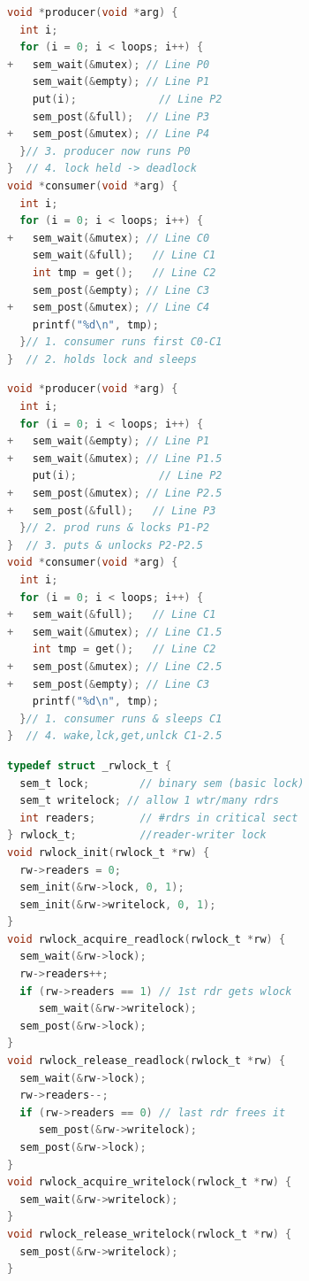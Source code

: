 \begin{minipage}{.5\linewidth}
\begin{lstlisting}[language=c,xleftmargin=2pt,xrightmargin=2pt,framexbottommargin=2pt]
void *producer(void *arg) {
  int i;
  for (i = 0; i < loops; i++) {
+   sem_wait(&mutex); // Line P0
    sem_wait(&empty); // Line P1
    put(i);             // Line P2
    sem_post(&full);  // Line P3
+   sem_post(&mutex); // Line P4
  }// 3. producer now runs P0
}  // 4. lock held -> deadlock
void *consumer(void *arg) {
  int i;
  for (i = 0; i < loops; i++) {
+   sem_wait(&mutex); // Line C0
    sem_wait(&full);   // Line C1
    int tmp = get();   // Line C2
    sem_post(&empty); // Line C3
+   sem_post(&mutex); // Line C4
    printf("%d\n", tmp);
  }// 1. consumer runs first C0-C1
}  // 2. holds lock and sleeps
\end{lstlisting}
\end{minipage}
\begin{minipage}{.5\linewidth}
\begin{lstlisting}[language=c,xleftmargin=4pt,xrightmargin=0pt,framexbottommargin=2pt]
void *producer(void *arg) {
  int i;
  for (i = 0; i < loops; i++) {
+   sem_wait(&empty); // Line P1
+   sem_wait(&mutex); // Line P1.5
    put(i);             // Line P2
+   sem_post(&mutex); // Line P2.5
+   sem_post(&full);   // Line P3
  }// 2. prod runs & locks P1-P2
}  // 3. puts & unlocks P2-P2.5
void *consumer(void *arg) {
  int i;
  for (i = 0; i < loops; i++) {
+   sem_wait(&full);   // Line C1
+   sem_wait(&mutex); // Line C1.5
    int tmp = get();   // Line C2
+   sem_post(&mutex); // Line C2.5
+   sem_post(&empty); // Line C3
    printf("%d\n", tmp);
  }// 1. consumer runs & sleeps C1
}  // 4. wake,lck,get,unlck C1-2.5
\end{lstlisting}
\end{minipage}
\begin{minipage}{.64\linewidth}
\begin{lstlisting}[language=c,framexbottommargin=1pt]
typedef struct _rwlock_t {
  sem_t lock;        // binary sem (basic lock)
  sem_t writelock; // allow 1 wtr/many rdrs
  int readers;       // #rdrs in critical sect
} rwlock_t;          //reader-writer lock
void rwlock_init(rwlock_t *rw) {
  rw->readers = 0;
  sem_init(&rw->lock, 0, 1);
  sem_init(&rw->writelock, 0, 1);
}
void rwlock_acquire_readlock(rwlock_t *rw) {
  sem_wait(&rw->lock);
  rw->readers++;
  if (rw->readers == 1) // 1st rdr gets wlock
     sem_wait(&rw->writelock);
  sem_post(&rw->lock);
}
void rwlock_release_readlock(rwlock_t *rw) {
  sem_wait(&rw->lock);
  rw->readers--;
  if (rw->readers == 0) // last rdr frees it
     sem_post(&rw->writelock);
  sem_post(&rw->lock);
}
void rwlock_acquire_writelock(rwlock_t *rw) {
  sem_wait(&rw->writelock);
}
void rwlock_release_writelock(rwlock_t *rw) {
  sem_post(&rw->writelock);
}
\end{lstlisting}
\end{minipage}
